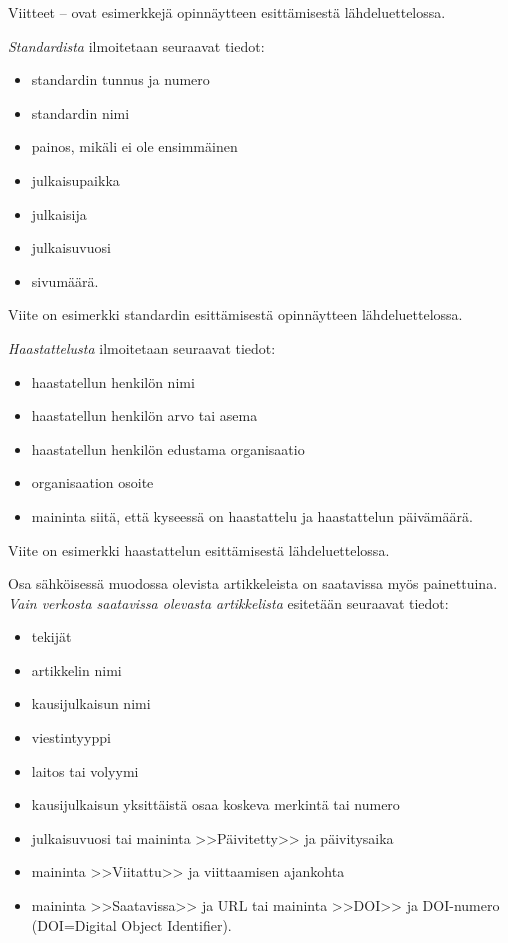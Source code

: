 \documentclass[english,12pt,a4paper,pdftex,elec,utf8]{aaltothesis}
\begin{document}
Viitteet \cite{Miinusmaa}--\cite{Lonnqvist} ovat esimerkkej\"a
opinn\"aytteen esitt\"amisest\"a l\"ahdeluettelossa. 

\textit{Standardista} ilmoitetaan seuraavat tiedot:

\begin{itemize}
\item[--]standardin tunnus ja numero
\item[--]standardin nimi
\item[--]painos, mik\"ali ei ole ensimm\"ainen
\item[--]julkaisupaikka
\item[--]julkaisija
\item[--]julkaisuvuosi
\item[--]sivum\"a\"ar\"a.
\end{itemize}
Viite \cite{sfs} on esimerkki standardin esitt\"amisest\"a opinn\"aytteen
l\"ahdeluettelossa. 

\textit{Haastattelusta} ilmoitetaan seuraavat tiedot:

\begin{itemize}
\item[--]haastatellun henkil\"on nimi
\item[--]haastatellun henkil\"on arvo tai asema
\item[--]haastatellun henkil\"on edustama organisaatio
\item[--]organisaation osoite
\item[--]maininta siit\"a, ett\"a kyseess\"a on haastattelu ja haastattelun
p\"aiv\"am\"a\"ar\"a. 
\end{itemize}

Viite \cite{haastattelu} on esimerkki 
haastattelun esitt\"amisest\"a l\"ahdeluettelossa.

Osa s\"ahk\"oisess\"a muodossa olevista artikkeleista on saatavissa my\"os
painettuina. \textit{Vain verkosta saatavissa olevasta artikkelista} esitet\"a\"an
seuraavat tiedot:

\begin{itemize}
\item[--]tekij\"at
\item[--]artikkelin nimi
\item[--]kausijulkaisun nimi
\item[--]viestintyyppi
\item[--]laitos tai volyymi
\item[--]kausijulkaisun yksitt\"aist\"a osaa koskeva merkint\"a tai numero
\item[--]julkaisuvuosi tai maininta >>P\"aivitetty>> ja p\"aivitysaika
\item[--]maininta >>Viitattu>> ja viittaamisen ajankohta 
\item[--]maininta >>Saatavissa>> ja URL tai 
        maininta >>DOI>> ja DOI-numero (DOI=Digital Object Identifier).
\end{itemize}
\end{document}

